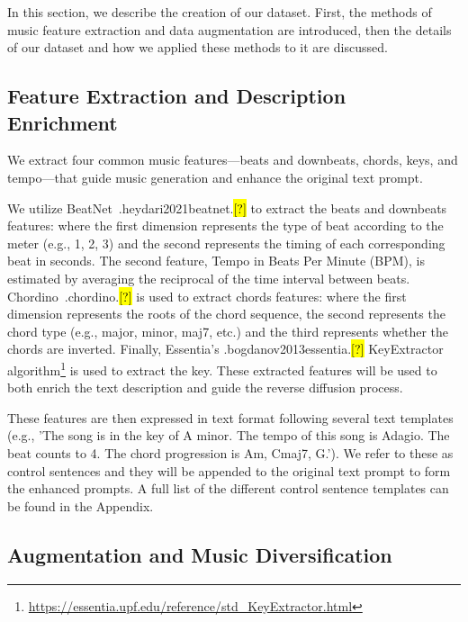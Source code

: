 \documentclass[11pt]{article}
\let\realcite\cite
\renewcommand{\cite}[1]{\ifx.#1.\hl{[?]}\else\realcite{#1}\fi}
\begin{document}
In this section, we describe the creation of our \dataset{} dataset. First, the methods of music feature extraction and data augmentation are introduced, then the details of our dataset and how we applied these methods to it are discussed.

\subsection{Feature Extraction and Description Enrichment}\label{sec:method_feature_extract}

We extract four common music features---beats and downbeats, chords, keys, and tempo---that guide music generation and enhance the original text prompt. 




We utilize BeatNet~\cite{heydari2021beatnet} to extract the beats and downbeats features:  where the first dimension represents the type of beat according to the meter (e.g., 1, 2, 3) and the second represents the timing of each corresponding beat in seconds. The second feature, Tempo in Beats Per Minute (BPM), is estimated by averaging the reciprocal of the time interval between beats. Chordino~\cite{chordino} is used to extract chords features:  where the first dimension represents the roots of the chord sequence, the second represents the chord type (e.g., major, minor, maj7, etc.) and the third represents whether the chords are inverted. Finally, Essentia's \cite{bogdanov2013essentia} KeyExtractor algorithm\footnote{\url{https://essentia.upf.edu/reference/std_KeyExtractor.html}} is used to extract the key. These extracted features will be used to both enrich the text description and guide the reverse diffusion process. 






These features are then expressed in text format following several text templates (e.g., 'The song is in the key of A minor. The tempo of this song is Adagio. The beat counts to 4. The chord progression is Am, Cmaj7, G.'). We refer to these as control sentences and they will be appended to the original text prompt to form the enhanced prompts. A full list of the different control sentence templates can be found in the Appendix.




\subsection{Augmentation and Music Diversification}\label{sec:method_data_aug}
\end{document}
